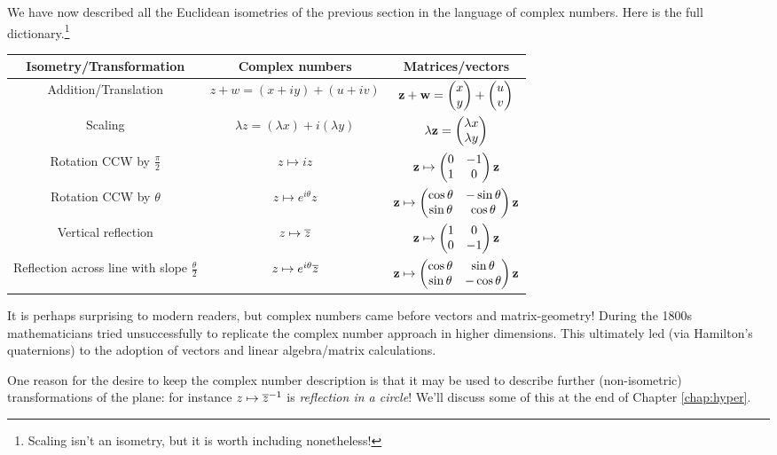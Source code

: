 We have now described all the Euclidean isometries of the previous section in the language of complex numbers. Here is the full dictionary.\footnote{Scaling isn't an isometry, but it is worth including nonetheless!}
\begin{center}
	\begin{tabular}{c|c|c}
		Isometry/Transformation
		&
		Complex numbers
		&
		Matrices/vectors
		\\\hline
		Addition/Translation
		&
		$z+w=(x+iy)+(u+iv)$
		&
		${\mathbf{z}}+{\mathbf{w}}=\begin{pmatrix}x\\y\end{pmatrix}+\begin{pmatrix}u\\v\end{pmatrix}$
		\\
		Scaling
		&
		$\lambda z=(\lambda x)+i(\lambda y)$
		&
		$\lambda{\mathbf{z}}=\begin{pmatrix}\lambda x\\\lambda y\end{pmatrix}$
		\\
		Rotation CCW by $\frac\pi 2$
		&
		$z\mapsto iz$
		&
		${\mathbf{z}}\mapsto
		\begin{pmatrix}
			0&-1\\
			1&0
		\end{pmatrix}
		{\mathbf{z}}$
		\\
		Rotation CCW by $\theta$
		&
		$z\mapsto e^{i\theta}z$
		&
		${\mathbf{z}}\mapsto
		\begin{pmatrix}
			\cos\theta&-\sin\theta\\
			\sin\theta&\cos\theta
		\end{pmatrix}
		{\mathbf{z}}$
		\\
		Vertical reflection
		&
		$z\mapsto \overline{z}$
		&
		${\mathbf{z}}\mapsto
		\begin{pmatrix}
			1&0\\
			0&-1
		\end{pmatrix}
		{\mathbf{z}}$
		\\
		Reflection across line with slope $\frac\theta 2$
		&
		$z\mapsto e^{i\theta}\overline{z}$
		&
		${\mathbf{z}}\mapsto
		\begin{pmatrix}
			\cos\theta&\sin\theta\\
			\sin\theta&-\cos\theta
		\end{pmatrix}
		{\mathbf{z}}$
	\end{tabular}
\end{center}

It is perhaps surprising to modern readers, but complex numbers came before vectors and matrix-geometry! During the 1800s mathematicians tried unsuccessfully to replicate the complex number approach in higher dimensions. This ultimately led (via Hamilton's quaternions) to the adoption of vectors and linear algebra/matrix calculations.\smallbreak

One reason for the desire to keep the complex number description is that it may be used to describe further (non-isometric) transformations of the plane: for instance $z\mapsto\overline{z}^{-1}$ is \emph{reflection in a circle}! We'll discuss some of this at the end of Chapter \ref{chap:hyper}.

